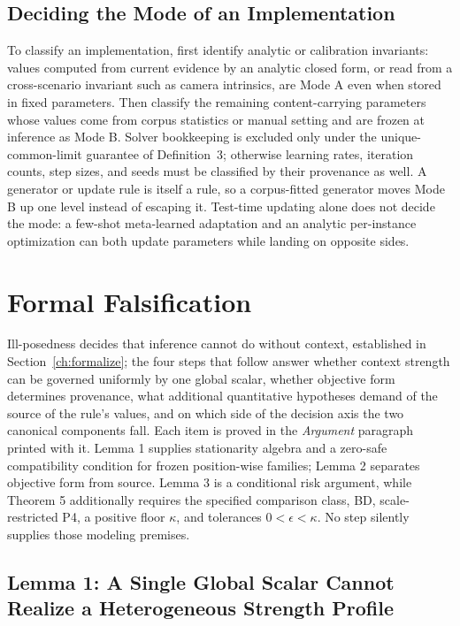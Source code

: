 \documentclass[twoside,11pt]{article}
\begin{document}
\subsection{Deciding the Mode of an Implementation}
\label{sec:procedure}%

To classify an implementation, first identify analytic or calibration invariants: values computed from current evidence by an analytic closed form, or read from a cross-scenario invariant such as camera intrinsics, are Mode A even when stored in fixed parameters. Then classify the remaining content-carrying parameters whose values come from corpus statistics or manual setting and are frozen at inference as Mode B. Solver bookkeeping is excluded only under the unique-common-limit guarantee of Definition~3; otherwise learning rates, iteration counts, step sizes, and seeds must be classified by their provenance as well. A generator or update rule is itself a rule, so a corpus-fitted generator moves Mode B up one level instead of escaping it. Test-time updating alone does not decide the mode: a few-shot meta-learned adaptation and an analytic per-instance optimization can both update parameters while landing on opposite sides.

\section{Formal Falsification}
\label{ch:falsify}%

Ill-posedness decides that inference cannot do without context, established in Section~\ref{ch:formalize}; the four steps that follow answer whether context strength can be governed uniformly by one global scalar, whether objective form determines provenance, what additional quantitative hypotheses demand of the source of the rule's values, and on which side of the decision axis the two canonical components fall. Each item is proved in the \emph{Argument} paragraph printed with it. Lemma 1 supplies stationarity algebra and a zero-safe compatibility condition for frozen position-wise families; Lemma 2 separates objective form from source. Lemma 3 is a conditional risk argument, while Theorem 5 additionally requires the specified comparison class, BD, scale-restricted P4, a positive floor $\kappa$, and tolerances $0<\epsilon<\kappa$. No step silently supplies those modeling premises.

\subsection{Lemma 1: A Single Global Scalar Cannot Realize a Heterogeneous Strength Profile}
\end{document}
